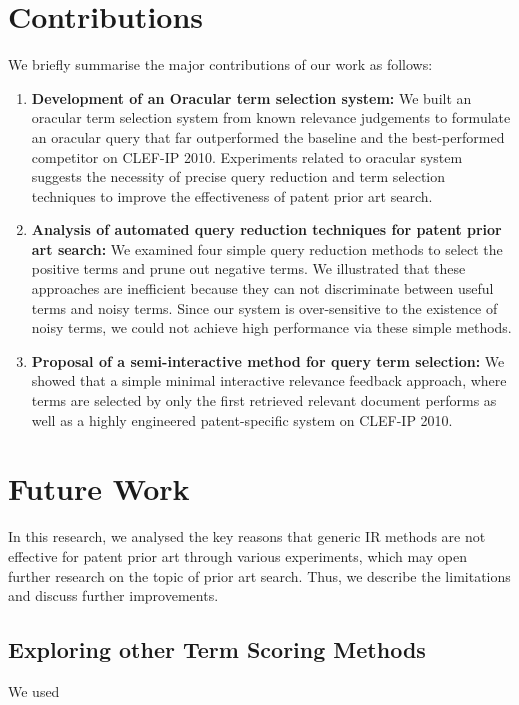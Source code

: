 \section{Contributions}
\label{sec:contributions}
We briefly summarise the major contributions of our work as follows:
\begin{enumerate}
\item \textbf{Development of an Oracular term selection system: }We built an oracular term selection system from known relevance judgements to formulate an oracular query that far outperformed the baseline and the best-performed competitor on CLEF-IP 2010. 
Experiments related to oracular system suggests the necessity of precise query
reduction and term selection techniques to improve the effectiveness of patent
prior art search.
\item \textbf{Analysis of automated query reduction techniques for patent prior art search: } We examined four simple query reduction methods to select the positive terms and prune out negative terms. We illustrated that these approaches are inefficient because they can not discriminate between useful terms and noisy terms. Since our system is over-sensitive to the existence of noisy terms, we could not achieve high performance via these simple methods. 
\item \textbf{Proposal of a semi-interactive method for query term selection: }We showed that a simple minimal interactive relevance feedback approach, where terms are selected by only the first retrieved relevant document performs as well as a highly engineered patent-specific system on CLEF-IP 2010. 
\end{enumerate}

\section{Future Work}
\label{sec:future}
In this research, we analysed the key reasons that generic IR methods are not effective for patent prior art through various experiments, which may open further research on the topic of prior art search. Thus, we describe the limitations and discuss further improvements.
\subsection{Exploring other Term Scoring Methods}
\label{subsec:ExploringTermScoringMethods}
We used 
